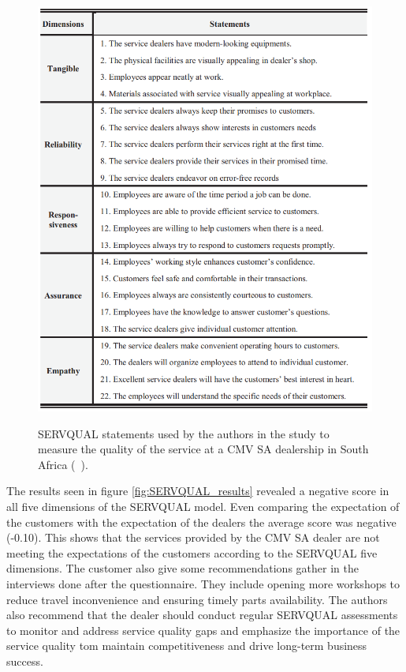 \begin{figure}[h]
  \caption{SERVQUAL statements used by the authors in the study to measure the quality of the service at a CMV SA dealership in South Africa (~\cite{Measuring_After_sales_Service_Quality}).}
  \centering
  \includegraphics[width=\textwidth]{figs/SERVQUAL_statements}
  \label{fig:SERVQUAL_statements}
\end{figure}


The results seen in figure \ref{fig:SERVQUAL_results} revealed a negative score in all five dimensions of the SERVQUAL model. 
Even comparing the expectation of the customers with the expectation of the dealers the average score was negative (-0.10).
This shows that the services provided by the CMV SA dealer are not meeting the expectations of the customers according to the SERVQUAL five dimensions.
The customer also give some recommendations gather in the interviews done after the questionnaire. 
They include opening more workshops to reduce travel inconvenience and ensuring timely parts availability.
The authors also recommend that the dealer should conduct regular SERVQUAL assessments to monitor and address service quality gaps and emphasize the importance of the service quality tom maintain competitiveness and drive long-term business success. ~\cite{Measuring_After_sales_Service_Quality}


